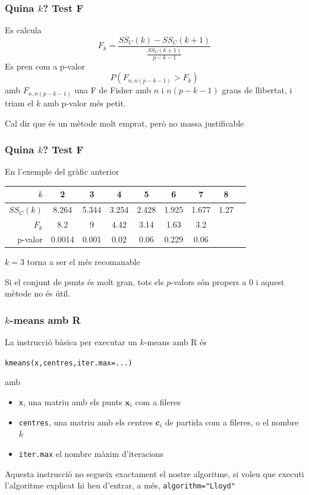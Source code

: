 \documentclass[12pt,t]{beamer}
\theoremstyle{plain}
\theoremstyle{definition}
\begin{document}
\begin{frame}
\frametitle{Quina $k$? Test F}
\vspace*{-2ex}

Es calcula
$$
F_k=\frac{SS_C(k)-SS_C(k+1)}{\frac{SS_C(k+1)}{p-k-1}}
$$
Es pren com a p-valor
$$
P(F_{n,n(p-k-1)}>F_k)
$$
amb $F_{n,n(p-k-1)}$ una F de Fisher amb $n$  i $n(p-k-1)$ graus de llibertat, i triam el $k$ amb p-valor més petit. 
\medskip

Cal dir que és un mètode molt emprat, però no massa justificable
\end{frame}


\begin{frame}
\frametitle{Quina $k$? Test F}

En l'exemple del gràfic anterior
\begin{center}
\footnotesize 
\begin{tabular}{r|cccccccc}
\hline
$k$ & 2 & 3 & 4 & 5 & 6 & 7 & 8\\ \hline
$SS_C(k)$ & 8.264 & 5.344 & 3.254 & 2.428& 1.925& 1.677 & 1.27\\ \hline
$F_k$ & 8.2 & 9 & 4.42 & 3.14 & 1.63 & 3.2 & \\ \hline
p-valor &  0.0014 & 0.001 & 0.02  & 0.06  & 0.229 & 0.06\\ \hline
\end{tabular}
\end{center}
\medskip

$k=3$ torna a ser el més recomanable
\medskip

Si el conjunt de punts és molt gran, tots els $p$-valors són propers a 0 i aquest mètode no és útil.

\end{frame}



\begin{frame}[fragile]
\frametitle{$k$-means amb R}

La instrucció bàsica per executar un $k$-means amb R és 
\begin{center}
\texttt{kmeans(x,centres,iter.max=...)}
\end{center}
amb 
\begin{itemize}
\item \texttt{x}, una matriu amb els punts $\mathbf{x}_i$ com a fileres 

\item \texttt{centres}, una matriu amb els centres  $\mathbf{c}_i$ de partida com a fileres, o el nombre $k$

\item \texttt{iter.max} el nombre màxim d'iteracions
\end{itemize}
Aquesta instrucció no segueix exactament el nostre algoritme, si voleu que executi l'algoritme explicat hi heu d'entrar, a més, \verb?algorithm="Lloyd"?

\end{frame}
\end{document}
